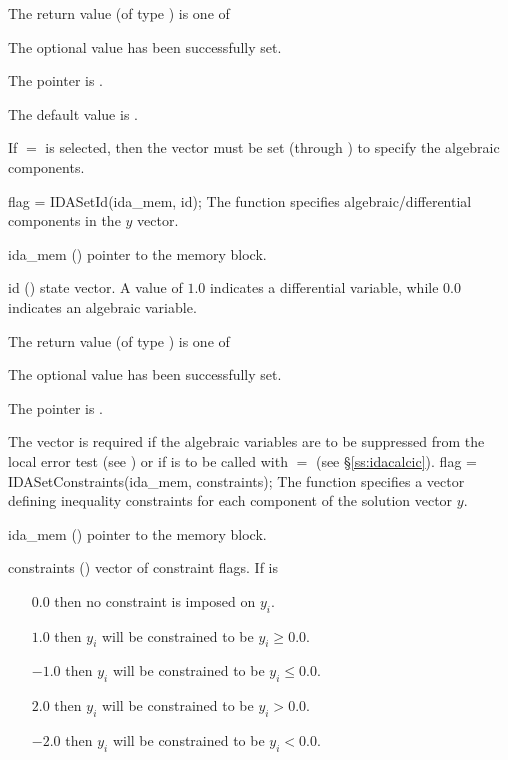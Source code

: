 {
  The return value  (of type ) is one of
  \begin{args}
  \item[\Id{IDA\_SUCCESS}] 
    The optional value has been successfully set.
  \item[\Id{IDA\_MEM\_NULL}]
    The  pointer is .
  \end{args}
}
{
  The default value is .

  If $=$ is selected, then the  vector
  must be set (through ) to specify the algebraic components.
}
{
flag = IDASetId(ida\_mem, id);
}
{
  The function  specifies algebraic/differential
  components in the $y$ vector.
}
{
  \begin{args}
  \item[ida\_mem] ()
    pointer to the {\ida} memory block.
  \item[id] ()
    state vector. A value of $1.0$ indicates a differential variable, while
    $0.0$ indicates an algebraic variable.
  \end{args}
}
{
  The return value  (of type ) is one of
  \begin{args}
  \item[\Id{IDA\_SUCCESS}] 
    The optional value has been successfully set.
  \item[\Id{IDA\_MEM\_NULL}]
    The  pointer is .
  \end{args}
}
{
  The vector  is required if the algebraic variables are to be 
  suppressed from the local error test (see ) or
  if  is to be called with  $=$ 
  (see \S\ref{ss:idacalcic}).
}
{
flag = IDASetConstraints(ida\_mem, constraints);
}
{
  The function  specifies a vector defining
  inequality constraints for each component of the solution vector $y$.
}
{
  \begin{args}
  \item[ida\_mem] ()
    pointer to the {\ida} memory block.
  \item[constraints] ()
    vector of constraint flags. If  is
    \begin{itemize}    
    \item[$0.0$] then no constraint is imposed on $y_i$. 
    \item[$1.0$] then $y_i$ will be constrained to be $y_i \ge 0.0$.
    \item[$-1.0$] then $y_i$ will be constrained to be $y_i \le 0.0$.
    \item[$2.0$] then $y_i$ will be constrained to be $y_i > 0.0$.
    \item[$-2.0$] then $y_i$ will be constrained to be $y_i < 0.0$.
    \end{itemize}
  \end{args}
}
